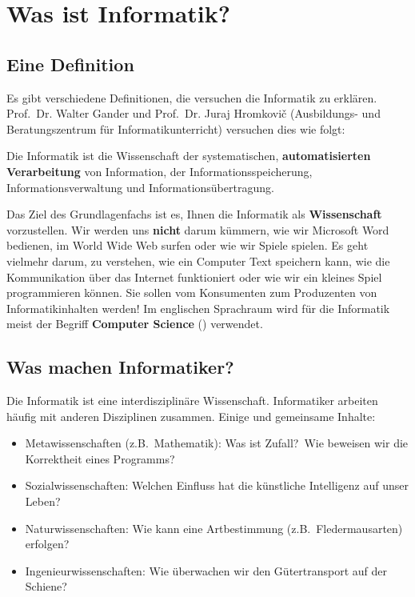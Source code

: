 
\toggletrue{image}
\togglefalse{imagehover}


\chapter{Was ist Informatik?}
\label{ch:was-ist-informatik}


\section{Eine Definition}
\label{sec:eine-definition}

Es gibt verschiedene Definitionen, die versuchen die Informatik zu erklären.
Prof.\ Dr. Walter Gander und Prof.\ Dr. Juraj Hromkovič (Ausbildungs- und Beratungszentrum für Informatikunterricht) versuchen dies wie folgt:

\begin{definition}[Informatik]
    Die Informatik ist die Wissenschaft der systematischen, \textbf{automatisierten Verarbeitung} von Information, der Informationsspeicherung,
    Informationsverwaltung und Informationsübertragung. \cite{def-informatik}
\end{definition}

Das Ziel des Grundlagenfachs ist es, Ihnen die Informatik als \textbf{Wissenschaft} vorzustellen.
Wir werden uns \textbf{nicht} darum kümmern, wie wir Microsoft Word bedienen, im World Wide Web surfen oder wie wir Spiele spielen.
Es geht vielmehr darum, zu verstehen, wie ein Computer Text speichern kann, wie die Kommunikation über das Internet funktioniert
oder wie wir ein kleines Spiel programmieren können.
Sie sollen vom Konsumenten zum Produzenten von Informatikinhalten werden!
Im englischen Sprachraum wird für die Informatik meist der Begriff \textbf{Computer Science} () verwendet.


\section{Was machen Informatiker?}
\label{sec:was-machen-informatiker}

Die Informatik ist eine interdisziplinäre Wissenschaft.
Informatiker arbeiten häufig mit anderen Disziplinen zusammen.
Einige  und gemeinsame Inhalte:

\begin{itemize}
    \item Metawissenschaften (z.B.\ Mathematik): Was ist Zufall?\ Wie beweisen wir die Korrektheit eines Programms?
    \item Sozialwissenschaften: Welchen Einfluss hat die künstliche Intelligenz auf unser Leben?
    \item Naturwissenschaften: Wie kann eine Artbestimmung (z.B.\ Fledermausarten) erfolgen?
    \item Ingenieurwissenschaften: Wie überwachen wir den Gütertransport auf der Schiene?
\end{itemize}


